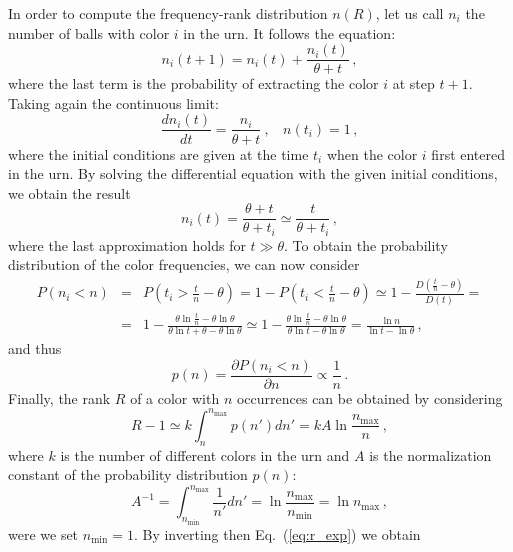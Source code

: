 \documentclass[graybox]{svmult}
\begin{document}
In order to compute the frequency-rank distribution $n(R)$,
let us call $n_i$  the number of balls with  color $i$ in the urn. It follows
the equation:
\begin{equation}
n_i(t+1)=n_i(t)+ \frac{n_i(t)}{\theta +t} \,,
\end{equation}
%
where the last term is the probability of extracting the
color $i$ at step $t+1$. Taking again the continuous limit: 
\begin{equation}
\frac{dn_i(t)}{  dt } = \frac{n_i}{\theta+t} ~,   ~~~~ n(t_i)=1 \,,
\end{equation}
%
where the initial conditions are given at the time $t_i$
when the color $i$ first entered in the urn.
By solving the differential equation with the given initial conditions,
we obtain the result
\begin{equation}
n_i (t)= \frac{\theta +t}{\theta +t_i} \simeq \frac{t}{\theta +t_i}  \,,
\end{equation}
%
where the last approximation holds for $t \gg \theta$.
To obtain the probability distribution of the color
frequencies, we can now consider
\begin{eqnarray}
P(n_i<n) &=&P(t_i >\frac{t}{n} -\theta) = 1 - P(t_i <\frac{t}{n}
-\theta) \simeq 1- \frac{D(\frac{t}{n}-\theta)}{D(t)} = \nonumber \\
&=&  1-
\frac{\theta \ln{\frac{t}{n}} -\theta \ln{\theta}}{ \theta
  \ln{t+\theta} - \theta \ln{\theta} } \simeq 1-
\frac{\theta \ln{\frac{t}{n}} -\theta \ln{\theta}}{ \theta
  \ln{t} - \theta \ln{\theta} } =  \frac{\ln {n}}{ \ln {t}-\ln{\theta}}\,,
\end{eqnarray}
%
and thus
\begin{equation}
p(n)= \frac{\partial P(n_i<n)}{\partial n} \propto \frac{1}{n} \,.
\end{equation}
%
Finally, the rank $R$ of a color with $n$ occurrences can
be obtained by considering
\begin{equation}\label{eq:r_exp}
R -1 \simeq k \int_{n}^{n_{\max}} p(n') dn'  = k A \ln{\frac{n_{\max}}{n}}   \,,
\end{equation}
%
 where $k$ is the number of different colors in the urn and
$A$ is the normalization constant of the probability distribution  $p(n)$:
\begin{equation}\label{eq:A}
A^{-1} = \int_{n_{\min}}^{n_{\max}} \frac{1}{n'} dn'  =\ln
\frac{n_{\max}}{n_{\min}} = \ln{n_{\max}}\,,
\end{equation}
%
were we set $n_{\min}=1$. 
By inverting then  Eq.~(\ref{eq:r_exp}) we obtain
\end{document}
